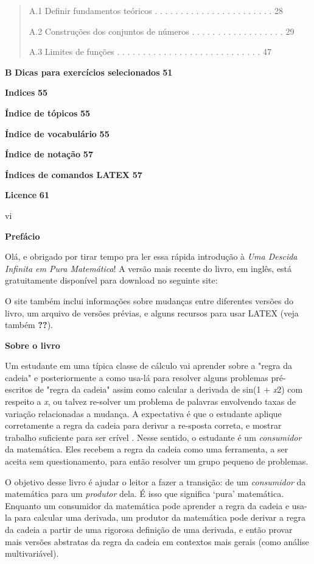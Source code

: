 \documentclass[
]{article}
\begin{document}
\begin{quote}
A.1 Definir fundamentos teóricos . . . . . . . . . . . . . . . . . . . .
. . . 28

A.2 Construções dos conjuntos de números . . . . . . . . . . . . . . . .
. . 29

A.3 Limites de funções . . . . . . . . . . . . . . . . . . . . . . . . .
. . . 47
\end{quote}

\textbf{B} \textbf{Dicas para exercícios selecionados} \textbf{51}

\textbf{Indices} \textbf{55}

\textbf{Índice de tópicos} \textbf{55}

\textbf{Índice de vocabulário} \textbf{55}

\textbf{Índice de notação} \textbf{57}

\textbf{Índices de comandos LATEX} \textbf{57}

\textbf{Licence} \textbf{61}

vi

\textbf{Prefácio}

Olá, e obrigado por tirar tempo pra ler essa rápida introdução à
\emph{Uma Descida Infinita em Pura Matemática}! A versão mais recente do
livro, em inglês, está gratuitamente disponível para download no
seguinte site:

O site também inclui informações sobre mudanças entre diferentes versões
do livro, um arquivo de versões prévias, e alguns recursos para usar
LATEX (veja também \textbf{??}).

\textbf{Sobre o livro}

Um estudante em uma típica classe de cálculo vai aprender sobre a "regra
da cadeia" e posteriormente a como usa-lá para resolver alguns problemas
pré-escritos de "regra da cadeia" assim como calcular a derivada de
sin(1 + \emph{x}2) com respeito a \emph{x}, ou talvez re-solver um
problema de palavras envolvendo taxas de variação relacionadas a
mudança. A expectativa é que o estudante aplique corretamente a regra da
cadeia para derivar a re-sposta correta, e mostrar trabalho suficiente
para ser crível . Nesse sentido, o estudante é um \emph{consumidor} da
matemática. Eles recebem a regra da cadeia como uma ferramenta, a ser
aceita sem questionamento, para então resolver um grupo pequeno de
problemas.

O objetivo desse livro é ajudar o leitor a fazer a transição: de um
\emph{consumidor} da matemática para um \emph{produtor} dela. É isso que
significa `pura' matemática. Enquanto um consumidor da matemática pode
aprender a regra da cadeia e usa-la para calcular uma derivada, um
produtor da matemática pode derivar a regra da cadeia a partir de uma
rigorosa definição de uma derivada, e então provar mais versões
abstratas da regra da cadeia em contextos mais gerais (como análise
multivariável).
\end{document}
